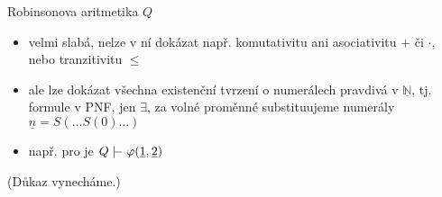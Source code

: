\documentclass{beamer}
\begin{document}
\begin{frame}{Robinsonova aritmetika $Q$}    

    
    \begin{itemize}
        \item velmi slabá, nelze v ní dokázat např. komutativitu ani asociativitu $+$ či $\cdot$, nebo tranzitivitu $\leq$
        \item ale lze dokázat všechna \alert{existenční tvrzení o numerálech} pravdivá v $\underline{\mathbb N}$, tj. formule v PNF, jen $\exists$, za volné proměnné substituujeme \alert{numerály} $\underline{n}=S(\dots S(0)\dots)$
        \item např. pro  je $Q\proves\varphi(\underline{1},\underline{2})$
    \end{itemize}

    \medskip
    

    (Důkaz vynecháme.)

\end{frame}
\end{document}

